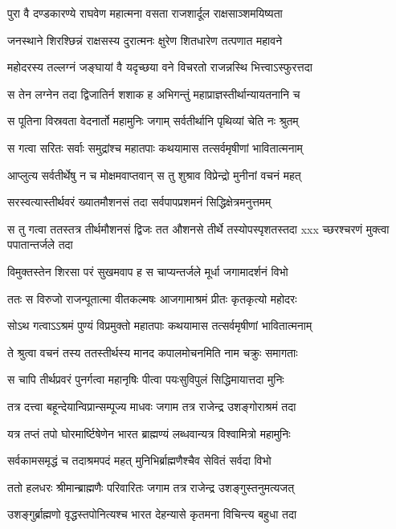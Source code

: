 \twolineshloka
{पुरा वै दण्डकारण्ये राघवेण महात्मना}
{वसता राजशार्दूल राक्षसाञ्शमयिष्यता}


\twolineshloka
{जनस्थाने शिरश्छिन्नं राक्षसस्य दुरात्मनः}
{क्षुरेण शितधारेण तत्पणात महावने}


\twolineshloka
{महोदरस्य तल्लग्नं जङ्घायां वै यदृच्छया}
{वने विचरतो राजन्नस्थि भित्त्वाऽस्फुरत्तदा}


\twolineshloka
{स तेन लग्नेन तदा द्विजातिर्न शशाक ह}
{अभिगन्तुं महाप्राज्ञस्तीर्थान्यायतनानि च}


\twolineshloka
{स पूतिना विस्रवता वेदनार्तो महामुनिः}
{जगाम् सर्वतीर्थानि पृथिव्यां चेति नः श्रुतम्}


\twolineshloka
{स गत्वा सरितः सर्वाः समुद्रांश्च महातपाः}
{कथयामास तत्सर्वमृषीणां भावितात्मनाम्}


\twolineshloka
{आप्लुत्य सर्वतीर्थेषु न च मोक्षमवाप्तवान्}
{स तु शुश्राव विप्रेन्द्रो मुनीनां वचनं महत्}


\twolineshloka
{सरस्वत्यास्तीर्थवरं ख्यातमौशनसं तदा}
{सर्वपापप्रशमनं सिद्धिक्षेत्रमनुत्तमम्}


स तु गत्वा ततस्तत्र तीर्थमौशनसं द्विजः
\twolineshloka
{तत औशनसे तीर्थे तस्योपस्पृशतस्तदा}
{xxx च्छरश्चरणं मुक्त्वा पपातान्तर्जले तदा}


\twolineshloka
{विमुक्तस्तेन शिरसा परं सुखमवाप ह}
{स चाप्यन्तर्जले मूर्धा जगामादर्शनं विभो}


\twolineshloka
{ततः स विरुजो राजन्पूतात्मा वीतकल्मषः}
{आजगामाश्रमं प्रीतः कृतकृत्यो महोदरः}


\twolineshloka
{सोऽथ गत्वाऽऽश्रमं पुण्यं विप्रमुक्तो महातपाः}
{कथयामास तत्सर्वमृषीणां भावितात्मनाम्}


\twolineshloka
{ते श्रुत्वा वचनं तस्य ततस्तीर्थस्य मानद}
{कपालमोचनमिति नाम चक्रुः समागताः}


\twolineshloka
{स चापि तीर्थप्रवरं पुनर्गत्वा महानृषिः}
{पीत्वा पयःसुविपुलं सिद्धिमायात्तदा मुनिः}


\twolineshloka
{तत्र दत्त्वा बहून्देयान्विप्रान्सम्पूज्य माधवः}
{जगाम तत्र राजेन्द्र उशङ्गोराश्रमं तदा}


\twolineshloka
{यत्र तप्तं तपो घोरमार्ष्टिषेणेन भारत}
{ब्राह्मण्यं लब्धवान्यत्र विश्वामित्रो महामुनिः}


\twolineshloka
{सर्वकामसमृद्धं च तदाश्रमपदं महत्}
{मुनिभिर्ब्राह्मणैश्चैव सेवितं सर्वदा विभो}


\twolineshloka
{ततो हलधरः श्रीमान्ब्राह्मणैः परिवारितः}
{जगाम तत्र राजेन्द्र उशङ्गुस्तनुमत्यजत्}


\twolineshloka
{उशङ्गुर्ब्राह्मणो वृद्धस्तपोनित्यश्च भारत}
{देहन्यासे कृतमना विचिन्त्य बहुधा तदा}


